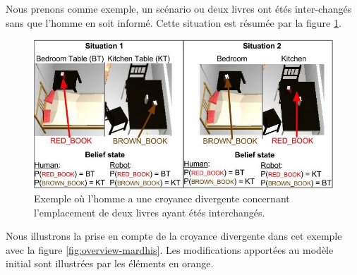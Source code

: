 \documentclass[a4paper,11pt,twoside]{StyleThese}
\begin{document}
Nous prenons comme exemple, un scénario ou deux livres ont étés inter-changés sans que l'homme en soit informé.
Cette situation est résumée par la figure \ref{fig:dbexemple}.

\begin{figure}[ht!]
 \centering
  \includegraphics[width=0.89\linewidth]{./img/dbexemple.jpg}
  \caption {Exemple où l'homme a une croyance divergente concernant l'emplacement de deux livres ayant étés interchangés.}
  \label{fig:dbexemple}
\end{figure}


Nous illustrons la prise en compte de la croyance divergente dans cet exemple avec la figure \ref{fig:overview-mardhis}. Les modifications apportées au modèle initial sont illustrées par les éléments en
orange.
\end{document}
